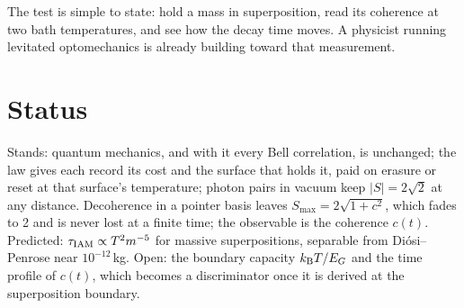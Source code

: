 The test is simple to state: hold a mass in superposition, read its coherence at two bath temperatures, and see how the decay time moves. A physicist running levitated optomechanics is already building toward that measurement.

\section{Status}
Stands: quantum mechanics, and with it every Bell correlation, is unchanged; the law gives each record its cost and the surface that holds it, paid
on erasure or reset at that surface's temperature; photon pairs in vacuum keep $|S|=2\sqrt2$ at any distance. \derived{} Decoherence in a pointer
basis leaves $S_{\max}=2\sqrt{1+c^2}$, which fades to 2 and is never lost at a finite time; the observable is the coherence $c(t)$. \derived{}
Predicted: $\tau_{\rm IAM}\propto T^2m^{-5}$ for massive superpositions, separable from Di\'osi--Penrose near $10^{-12}$\,kg. \prediction{} Open: the boundary capacity $k_{\mathrm B} T/E_G$ and the time profile of $c(t)$, which becomes a discriminator once it is derived at the superposition boundary. \openprob
